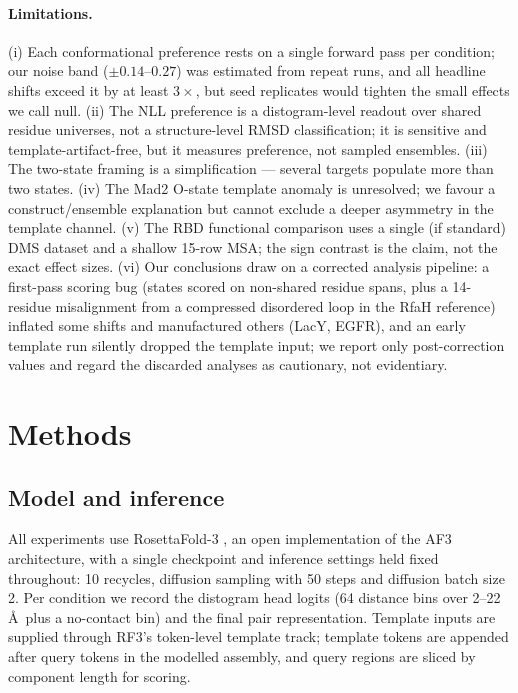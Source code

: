 \documentclass[11pt]{article}
\begin{document}
\paragraph{Limitations.}
(i) Each conformational preference rests on a single forward pass per
condition; our noise band ($\pm 0.14$--$0.27$) was estimated from repeat
runs, and all headline shifts exceed it by at least $3\times$, but seed
replicates would tighten the small effects we call null. (ii) The NLL
preference is a distogram-level readout over shared residue universes, not a
structure-level RMSD classification; it is sensitive and
template-artifact-free, but it measures preference, not sampled ensembles.
(iii) The two-state framing is a simplification --- several targets
populate more than two states. (iv) The Mad2 O-state template anomaly is
unresolved; we favour a construct/ensemble explanation but cannot exclude a
deeper asymmetry in the template channel. (v) The RBD functional comparison
uses a single (if standard) DMS dataset and a shallow 15-row MSA; the sign
contrast is the claim, not the exact effect sizes. (vi) Our conclusions draw
on a corrected analysis pipeline: a first-pass scoring bug (states scored on
non-shared residue spans, plus a 14-residue misalignment from a compressed
disordered loop in the RfaH reference) inflated some shifts and manufactured
others (LacY, EGFR), and an early template run silently dropped the template
input; we report only post-correction values and regard the discarded
analyses as cautionary, not evidentiary.

\section{Methods}

\subsection{Model and inference}
All experiments use RosettaFold-3 \cite{corley2025}, an open implementation
of the AF3 architecture, with a single checkpoint and inference settings
held fixed throughout: 10 recycles, diffusion sampling with 50 steps and
diffusion batch size 2. Per condition we record the distogram head logits
(64 distance bins over 2--22\,\AA\ plus a no-contact bin) and the final pair
representation. Template inputs are supplied through RF3's token-level
template track; template tokens are appended after query tokens in the
modelled assembly, and query regions are sliced by component length for
scoring.
\end{document}
